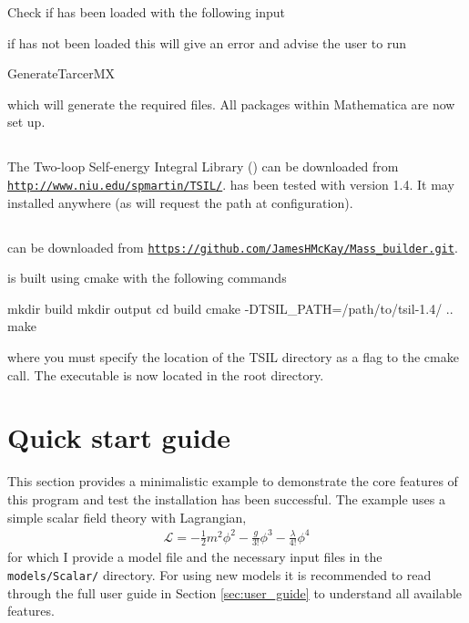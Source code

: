 Check if \tarcer has been loaded with the following input
if \tarcer has not been loaded this will give an error and advise the user to run
\begin{lstterm}
GenerateTarcerMX
\end{lstterm}
which will generate the required files.  All packages within Mathematica are now set up.

\subsection{\tsil}
The Two-loop Self-energy Integral Library (\tsils) can be downloaded from \href{http://www.niu.edu/spmartin/TSIL/}{\lstinline{http://www.niu.edu/spmartin/TSIL/}}.  \mb has been tested with version 1.4. It may installed anywhere (as \mb will request the path at configuration).

\subsection{\mb}
\mb can be downloaded from \href{https://github.com/JamesHMcKay/Mass_builder.git}{\lstinline{https://github.com/JamesHMcKay/Mass_builder.git}}.

\mb is built using cmake with the following commands
\begin{lstterm}
mkdir build
mkdir output
cd build
cmake -DTSIL_PATH=/path/to/tsil-1.4/ ..
make
\end{lstterm}
where you must specify the location of the TSIL directory as a flag to the cmake call.  The \mb executable is now located in the root directory.

\section{Quick start guide}

This section provides a minimalistic example to demonstrate the core features of this program and test the installation has been successful.  The example uses a simple scalar field theory with Lagrangian,
\begin{align}
\mathcal{L} = -\frac{1}{2}m^2\phi^2 - \frac{g}{3!}\phi^3-\frac{\lambda}{4!}\phi^4
\end{align}
for which I provide a \feynarts model file and the necessary \mb input files in the \lstinline{models/Scalar/} directory.  For using new models it is recommended to read through the full user guide in Section \ref{sec:user_guide} to understand all available features.

